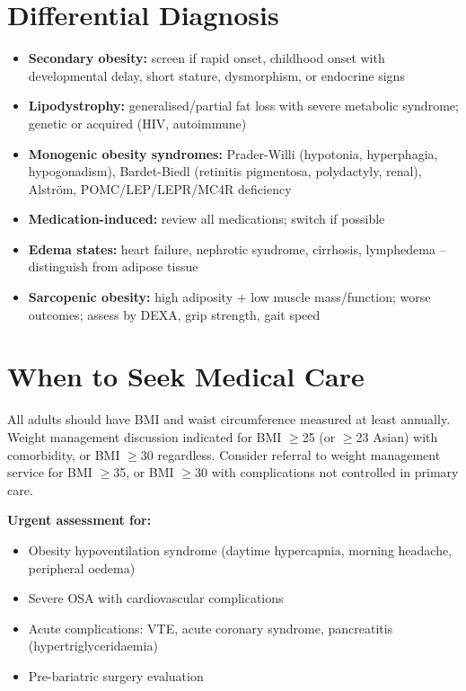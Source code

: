 \section*{Differential Diagnosis}
\begin{itemize}
    \item \textbf{Secondary obesity:} screen if rapid onset, childhood onset with developmental delay, short stature, dysmorphism, or endocrine signs
    \item \textbf{Lipodystrophy:} generalised/partial fat loss with severe metabolic syndrome; genetic or acquired (HIV, autoimmune)
    \item \textbf{Monogenic obesity syndromes:} Prader-Willi (hypotonia, hyperphagia, hypogonadism), Bardet-Biedl (retinitis pigmentosa, polydactyly, renal), Alström, POMC/LEP/LEPR/MC4R deficiency
    \item \textbf{Medication-induced:} review all medications; switch if possible
    \item \textbf{Edema states:} heart failure, nephrotic syndrome, cirrhosis, lymphedema -- distinguish from adipose tissue
    \item \textbf{Sarcopenic obesity:} high adiposity + low muscle mass/function; worse outcomes; assess by DEXA, grip strength, gait speed
\end{itemize}

\section*{When to Seek Medical Care}
All adults should have BMI and waist circumference measured at least annually. Weight management discussion indicated for BMI $\ge$25 (or $\ge$23 Asian) with comorbidity, or BMI $\ge$30 regardless. Consider referral to weight management service for BMI $\ge$35, or BMI $\ge$30 with complications not controlled in primary care.

\textbf{Urgent assessment for:}
\begin{itemize}
    \item Obesity hypoventilation syndrome (daytime hypercapnia, morning headache, peripheral oedema)
    \item Severe OSA with cardiovascular complications
    \item Acute complications: VTE, acute coronary syndrome, pancreatitis (hypertriglyceridaemia)
    \item Pre-bariatric surgery evaluation
\end{itemize}

